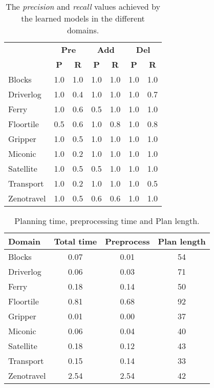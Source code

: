\documentclass[letterpaper]{article} %
\begin{document}
\begin{table}[hbt!]
\begin{small}
	\begin{center}
		\begin{tabular}{l|l|l|l|l|l|l|}
			 & \multicolumn{2}{|c|}{\bf Pre} & \multicolumn{2}{|c|}{\bf Add} & \multicolumn{2}{|c|}{\bf Del}  \\ \cline{2-7}			 
			  & \multicolumn{1}{|c|}{\bf P} & \multicolumn{1}{|c|}{\bf R} & \multicolumn{1}{|c|}{\bf P} & \multicolumn{1}{|c|}{\bf R} & \multicolumn{1}{|c|}{\bf P} & \multicolumn{1}{|c|}{\bf R} \\
			\hline
			Blocks & 1.0 & 1.0 & 1.0 & 1.0 & 1.0 & 1.0 \\
			Driverlog & 1.0 & 0.4 & 1.0 & 1.0 & 1.0 & 0.7 \\
			Ferry & 1.0 & 0.6 & 0.5 & 1.0 & 1.0 & 1.0 \\
			Floortile & 0.5 & 0.6 & 1.0 & 0.8 & 1.0 & 0.8 \\
			Gripper & 1.0 & 0.5 & 1.0 & 1.0 & 1.0 & 1.0 \\
			Miconic & 1.0 & 0.2 & 1.0 & 1.0 & 1.0 & 1.0 \\
			Satellite & 1.0 & 0.5 & 0.5 & 1.0 & 1.0 & 1.0 \\
			Transport & 1.0 & 0.2 & 1.0 & 1.0 & 1.0 & 0.5 \\
			Zenotravel & 1.0 & 0.5 & 0.6 & 0.6 & 1.0 & 1.0                         
		\end{tabular}
	\end{center}
	\end{small}
\caption{\small The {\em precision} and {\em recall} values achieved by the learned models in the different domains.}
\label{tab:results_plans_partial}
\end{table}

\begin{table}[hbt!]
\begin{small}
	\begin{center}
		\begin{tabular}{l|c|c|c|}			 
			Domain & Total time & Preprocess & Plan length  \\
			\hline
			Blocks & 0.07 & 0.01 & 54  \\
			Driverlog & 0.06 & 0.03 & 71 \\
			Ferry & 0.18 & 0.14 & 50 \\
			Floortile & 0.81 & 0.68 & 92 \\
			Gripper & 0.01 & 0.00 & 37 \\
			Miconic & 0.06 & 0.04 & 40  \\
			Satellite & 0.18 & 0.12 & 43 \\
			Transport & 0.15 & 0.14 & 33 \\
			Zenotravel & 2.54 & 2.54 & 42                         
		\end{tabular}
	\end{center}
        \end{small}
	\caption{\small Planning time, preprocessing time and Plan length.}
	\label{tab:time_plans_partial}	
\end{table}
\end{document}
